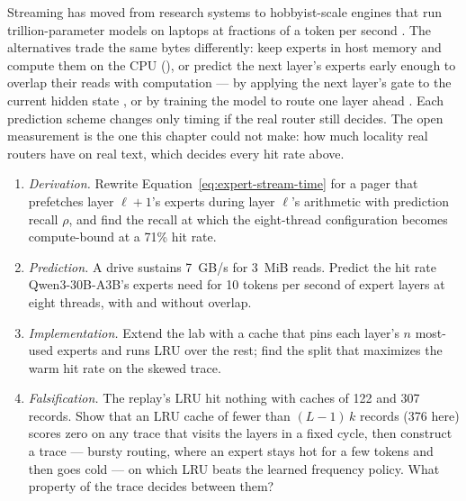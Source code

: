 
Streaming has moved from research systems to hobbyist-scale engines that run
trillion-parameter models on laptops at fractions of a token per second
\cite{sqliteai2026warp,khan2026kimik3c}. The alternatives trade the same bytes
differently: keep experts in host memory and compute them on the CPU
(), or predict the next layer's experts early enough to
overlap their reads with computation --- by applying the next layer's gate to
the current hidden state \cite{eliseev2023moeoffload}, or by training the
model to route one layer ahead \cite{hwang2023pregated}. Each prediction scheme
changes only timing if the real router still decides. The open measurement is
the one this chapter could not make: how much locality real routers have on
real text, which decides every hit rate above.

\ExercisesSection

\begin{enumerate}
\item \emph{Derivation.} Rewrite Equation~\ref{eq:expert-stream-time} for a
  pager that prefetches layer $\ell+1$'s experts during layer $\ell$'s
  arithmetic with prediction recall $\rho$, and find the recall at which the
  eight-thread configuration becomes compute-bound at a 71\% hit rate.
\item \emph{Prediction.} A drive sustains 7~GB/s for 3~MiB reads. Predict the
  hit rate Qwen3-30B-A3B's experts need for 10 tokens per second of expert
  layers at eight threads, with and without overlap.
\item \emph{Implementation.} Extend the lab with a cache that pins each layer's
  $n$ most-used experts and runs LRU over the rest; find the split that
  maximizes the warm hit rate on the skewed trace.
\item \emph{Falsification.} The replay's LRU hit nothing with caches of 122
  and 307 records. Show that an LRU cache of fewer than $(L-1)\,k$ records (376
  here) scores zero on any trace that visits the layers in a fixed cycle, then
  construct a trace --- bursty routing, where an expert stays hot
  for a few tokens and then goes cold --- on which LRU beats the learned
  frequency policy. What property of the trace decides between them?
\end{enumerate}
